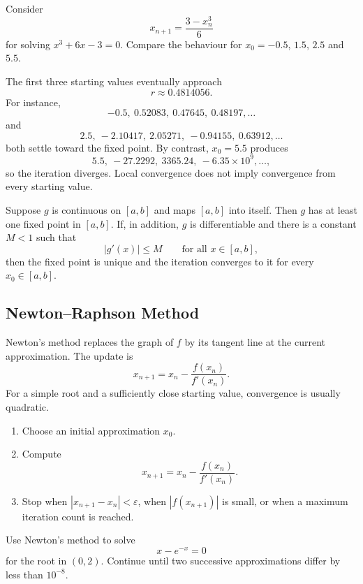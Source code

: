 \begin{example}
Consider
\[
 x_{n+1}=\frac{3-x_n^3}{6}
\]
for solving $x^3+6x-3=0$.  Compare the behaviour for $x_0=-0.5$, $1.5$, $2.5$ and $5.5$.
\end{example}

\begin{solution}[6.0cm]
The first three starting values eventually approach
\[
 r\approx0.4814056.
\]
For instance,
\[
 -0.5,\ 0.52083,\ 0.47645,\ 0.48197,\ldots
\]
and
\[
 2.5,\ -2.10417,\ 2.05271,\ -0.94155,\ 0.63912,\ldots
\]
both settle toward the fixed point.  By contrast, $x_0=5.5$ produces
\[
 5.5,\ -27.2292,\ 3365.24,\ -6.35\times10^9,\ldots,
\]
so the iteration diverges.  Local convergence does not imply convergence from every starting value.
\end{solution}

\begin{theorem}
Suppose $g$ is continuous on $[a,b]$ and maps $[a,b]$ into itself.  Then $g$ has at least one fixed point in $[a,b]$.  If, in addition, $g$ is differentiable and there is a constant $M<1$ such that
\[
 |g'(x)|\le M
 \qquad\text{for all }x\in[a,b],
\]
then the fixed point is unique and the iteration converges to it for every $x_0\in[a,b]$.
\end{theorem}

\subsection{Newton--Raphson Method}

Newton's method replaces the graph of $f$ by its tangent line at the current approximation.  The update is
\[
 x_{n+1}=x_n-\frac{f(x_n)}{f'(x_n)}.
\]
For a simple root and a sufficiently close starting value, convergence is usually quadratic.

\begin{algorithm}
\begin{enumerate}
  \item Choose an initial approximation $x_0$.
  \item Compute
  \[
    x_{n+1}=x_n-\frac{f(x_n)}{f'(x_n)}.
  \]
  \item Stop when $|x_{n+1}-x_n|<\varepsilon$, when $|f(x_{n+1})|$ is small, or when a maximum iteration count is reached.
\end{enumerate}
\end{algorithm}

\begin{example}
Use Newton's method to solve
\[
 x-e^{-x}=0
\]
for the root in $(0,2)$.  Continue until two successive approximations differ by less than $10^{-8}$.
\end{example}

